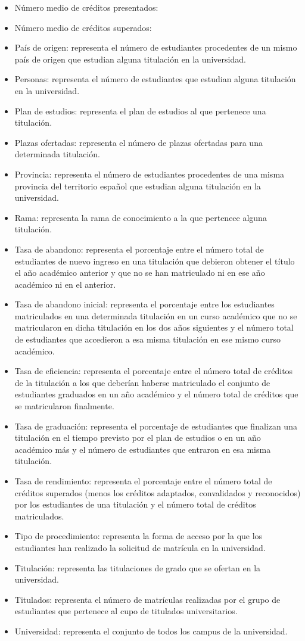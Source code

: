 \begin{itemize}
	\item Número medio de créditos presentados:
	\item Número medio de créditos superados:
	\item País de origen: representa el número de estudiantes procedentes de un mismo país de origen que estudian alguna titulación en la universidad.
	\item Personas: representa el número de estudiantes que estudian alguna titulación en la universidad.
	\item Plan de estudios: representa el plan de estudios al que pertenece una titulación.
	\item Plazas ofertadas: representa el número de plazas ofertadas para una determinada titulación.
	\item Provincia: representa el número de estudiantes procedentes de una misma provincia del territorio español que estudian alguna titulación en la universidad.
	\item Rama: representa la rama de conocimiento a la que pertenece alguna titulación.
	\item Tasa de abandono: representa el porcentaje entre el número total de estudiantes de nuevo ingreso en una titulación que debieron obtener el título el año académico anterior y que no se han matriculado ni en ese año académico ni en el anterior.
	\item Tasa de abandono inicial: representa el porcentaje entre los estudiantes matriculados en una determinada titulación en un curso académico que no se matricularon en dicha titulación en los dos años siguientes y el número total de estudiantes que accedieron a esa misma titulación en ese mismo curso académico.
	\item Tasa de eficiencia: representa el porcentaje entre el número total de créditos de la titulación a los que deberían haberse matriculado el conjunto de estudiantes graduados en un año académico y el número total de créditos que se matricularon finalmente.
	\item Tasa de graduación: representa el porcentaje de estudiantes que finalizan una titulación en el tiempo previsto por el plan de estudios o en un año académico más y el número de estudiantes que entraron en esa misma titulación.
	\item Tasa de rendimiento: representa el porcentaje entre el número total de créditos superados (menos los créditos adaptados, convalidados y reconocidos) por los estudiantes de una titulación y el número total de créditos matriculados.
	\item Tipo de procedimiento: representa la forma de acceso por la que los estudiantes han realizado la solicitud de matrícula en la universidad.
	\item Titulación: representa las titulaciones de grado que se ofertan en la universidad.
	\item Titulados: representa el número de matrículas realizadas por el grupo de estudiantes que pertenece al cupo de titulados universitarios.
	\item Universidad: representa el conjunto de todos los campus de la universidad.
\end{itemize}


